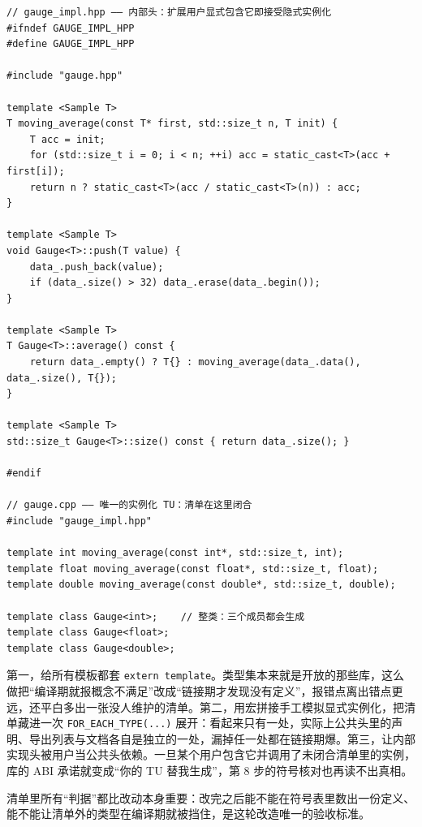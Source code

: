 \documentclass[12pt,a4paper,fontset=fandol]{ctexbook}
\newcommand{\kw}[1]{\texttt{#1}}
\begin{document}
\begin{lstlisting}[style=cppstyle,caption={改造后之二与三：定义进内部头，实例化进唯一 TU}]
// gauge_impl.hpp —— 内部头：扩展用户显式包含它即接受隐式实例化
#ifndef GAUGE_IMPL_HPP
#define GAUGE_IMPL_HPP

#include "gauge.hpp"

template <Sample T>
T moving_average(const T* first, std::size_t n, T init) {
    T acc = init;
    for (std::size_t i = 0; i < n; ++i) acc = static_cast<T>(acc + first[i]);
    return n ? static_cast<T>(acc / static_cast<T>(n)) : acc;
}

template <Sample T>
void Gauge<T>::push(T value) {
    data_.push_back(value);
    if (data_.size() > 32) data_.erase(data_.begin());
}

template <Sample T>
T Gauge<T>::average() const {
    return data_.empty() ? T{} : moving_average(data_.data(), data_.size(), T{});
}

template <Sample T>
std::size_t Gauge<T>::size() const { return data_.size(); }

#endif

// gauge.cpp —— 唯一的实例化 TU：清单在这里闭合
#include "gauge_impl.hpp"

template int moving_average(const int*, std::size_t, int);
template float moving_average(const float*, std::size_t, float);
template double moving_average(const double*, std::size_t, double);

template class Gauge<int>;    // 整类：三个成员都会生成
template class Gauge<float>;
template class Gauge<double>;
\end{lstlisting}

\begin{warning}[title={三种不该做}]
第一，给所有模板都套 \kw{extern template}。类型集本来就是开放的那些库，这么做把“编译期就报概念不满足”改成“链接期才发现没有定义”，报错点离出错点更远，还平白多出一张没人维护的清单。第二，用宏拼接手工模拟显式实例化，把清单藏进一次 \kw{FOR\_EACH\_TYPE(...)} 展开：看起来只有一处，实际上公共头里的声明、导出列表与文档各自是独立的一处，漏掉任一处都在链接期爆。第三，让内部实现头被用户当公共头依赖。一旦某个用户包含它并调用了未闭合清单里的实例，库的 ABI 承诺就变成“你的 TU 替我生成”，第 8 步的符号核对也再读不出真相。
\end{warning}

清单里所有“判据”都比改动本身重要：改完之后能不能在符号表里数出一份定义、能不能让清单外的类型在编译期就被挡住，是这轮改造唯一的验收标准。
\end{document}
